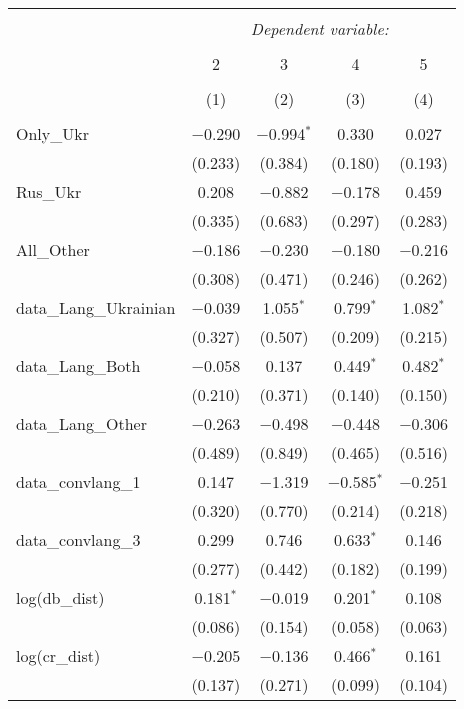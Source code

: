
\begin{table}[!htbp] \centering 
  \caption{} 
  \label{} 
\tiny 
\begin{tabular}{@{\extracolsep{1pt}}lcccc} 
\\[-1.8ex]\hline 
\hline \\[-1.8ex] 
 & \multicolumn{4}{c}{\textit{Dependent variable:}} \\ 
\cline{2-5} 
\\[-1.8ex] & 2 & 3 & 4 & 5 \\ 
\\[-1.8ex] & (1) & (2) & (3) & (4)\\ 
\hline \\[-1.8ex] 
 Only\_Ukr & $-$0.290 & $-$0.994$^{*}$ & 0.330 & 0.027 \\ 
  & (0.233) & (0.384) & (0.180) & (0.193) \\ 
  Rus\_Ukr & 0.208 & $-$0.882 & $-$0.178 & 0.459 \\ 
  & (0.335) & (0.683) & (0.297) & (0.283) \\ 
  All\_Other & $-$0.186 & $-$0.230 & $-$0.180 & $-$0.216 \\ 
  & (0.308) & (0.471) & (0.246) & (0.262) \\ 
  data\_Lang\_Ukrainian & $-$0.039 & 1.055$^{*}$ & 0.799$^{*}$ & 1.082$^{*}$ \\ 
  & (0.327) & (0.507) & (0.209) & (0.215) \\ 
  data\_Lang\_Both & $-$0.058 & 0.137 & 0.449$^{*}$ & 0.482$^{*}$ \\ 
  & (0.210) & (0.371) & (0.140) & (0.150) \\ 
  data\_Lang\_Other & $-$0.263 & $-$0.498 & $-$0.448 & $-$0.306 \\ 
  & (0.489) & (0.849) & (0.465) & (0.516) \\ 
  data\_convlang\_1 & 0.147 & $-$1.319 & $-$0.585$^{*}$ & $-$0.251 \\ 
  & (0.320) & (0.770) & (0.214) & (0.218) \\ 
  data\_convlang\_3 & 0.299 & 0.746 & 0.633$^{*}$ & 0.146 \\ 
  & (0.277) & (0.442) & (0.182) & (0.199) \\ 
  log(db\_dist) & 0.181$^{*}$ & $-$0.019 & 0.201$^{*}$ & 0.108 \\ 
  & (0.086) & (0.154) & (0.058) & (0.063) \\ 
  log(cr\_dist) & $-$0.205 & $-$0.136 & 0.466$^{*}$ & 0.161 \\ 
  & (0.137) & (0.271) & (0.099) & (0.104) \\ 

\end{tabular}
\end{table}
